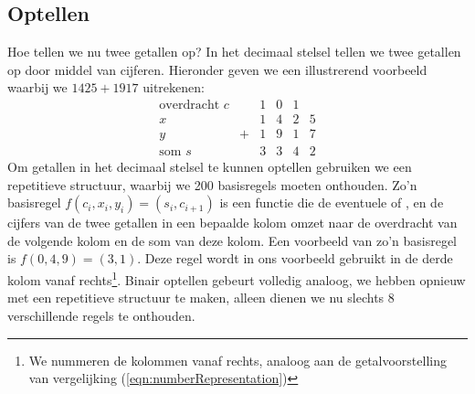 \subsection{Optellen}
\label{ss:add}
Hoe tellen we nu twee getallen op? In het decimaal stelsel tellen we twee getallen op door middel van cijferen. Hieronder geven we een illustrerend voorbeeld waarbij we $1425+1917$ uitrekenen:
\begin{equation}
\begin{array}{l|lcccc}
\mbox{overdracht $c$}&&1&0&1&\\
x&&1&4&2&5\\
y&+&1&9&1&7\\\hline
\mbox{som $s$}&&3&3&4&2
\end{array}
\end{equation}
Om getallen in het decimaal stelsel te kunnen optellen gebruiken we een repetitieve structuur, waarbij we 200 basisregels moeten onthouden. Zo'n basisregel $f\left(c_i,x_i,y_i\right)=\left(s_i,c_{i+1}\right)$ is een functie die de eventuele  of , en de cijfers van de twee getallen in een bepaalde kolom omzet naar de overdracht van de volgende kolom en de som van deze kolom. Een voorbeeld van zo'n basisregel is $f\left(0,4,9\right)=\left(3,1\right)$. Deze regel wordt in ons voorbeeld gebruikt in de derde kolom vanaf rechts\footnote{We nummeren de kolommen vanaf rechts, analoog aan de getalvoorstelling van vergelijking (\ref{eqn:numberRepresentation})}. Binair optellen gebeurt volledig analoog, we hebben opnieuw met een repetitieve structuur te maken, alleen dienen we nu slechts 8 verschillende regels te onthouden.
